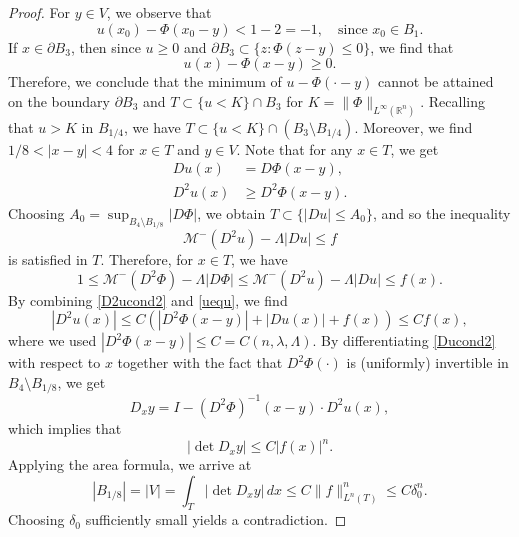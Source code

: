 \documentclass[11pt]{amsart}
\theoremstyle{plain}
\theoremstyle{definition}
\numberwithin{equation}{section}
\begin{document}
\begin{proof}
For $y \in V$, we observe that
\begin{equation*}
    u(x_0)-\Phi(x_0-y) < 1-2=-1, \quad \text{since $x_0 \in B_1$}.
\end{equation*}
If $x\in \partial B_3$, then since $u \geq 0$  and $\partial B_{3} \subset \{z:\Phi(z-y) \leq 0\}$, we find that
\begin{equation*}
    u(x) - \Phi(x-y) \geq 0.
\end{equation*}
Therefore, we conclude that the minimum of $u-\Phi(\cdot-y)$ cannot be attained on the boundary $\partial B_3$ and $T \subset \{ u<K\} \cap B_3$ for $K=\|\Phi\|_{L^\infty(\mathbb{R}^n)}$.
Recalling that $u>K$ in $B_{1/4}$, we have $T \subset \{ u<K\} \cap (B_3 \setminus B_{1/4})$.
Moreover, we find $1/8<|x-y| < 4$ for $x \in T$ and $y \in V$.
Note that for any $x \in T$, we get
\begin{align} \label{Ducond2}
    Du(x) &= D\Phi(x-y),\\ \label{D2ucond2}
    D^2u(x) &\geq D^2\Phi(x-y).
\end{align}
Choosing $A_0=\sup_{B_4\setminus B_{1/8}}|D\Phi|$, we obtain $T \subset \{|Du| \leq A_0\}$, and so the inequality
\begin{equation*}
    \mathcal{M}^-(D^2u)-\Lambda|Du| \leq f
\end{equation*}
is satisfied in $T$. Therefore, for $x \in T$, we have
\begin{equation} \label{uequ}
    1 \leq \mathcal{M}^-(D^2\Phi) -\Lambda|D\Phi| \leq \mathcal{M}^-(D^2u) -\Lambda|Du| \leq f(x).
\end{equation}
By combining \eqref{D2ucond2} and \eqref{uequ}, we find
\begin{equation*}
    |D^2u(x)| \leq C(|D^2\Phi(x-y)| + |Du(x)| +f(x)) \leq Cf(x),
\end{equation*}
where we used $|D^2\Phi(x-y)| \leq C=C(n, \lambda, \Lambda)$.
By differentiating \eqref{Ducond2} with respect to $x$ together with the fact that $D^2\Phi(\cdot)$ is (uniformly) invertible in $B_4 \setminus B_{1/8}$, we get
\begin{equation*}
	D_xy= I- (D^2 \Phi)^{-1}(x-y)  \cdot D^2u(x),
\end{equation*}
which implies that
\begin{equation*}
   |\det D_xy| \leq C|f(x)|^n.
\end{equation*}
Applying the area formula, we arrive at
\begin{equation*}
    |B_{1/8}| = |V| =\int_{T}|\det D_xy|\,dx \leq C\|f\|_{L^n(T)}^n \leq C\delta_0^n.
\end{equation*}
Choosing $\delta_0$ sufficiently small yields a contradiction.
\end{proof}
\end{document}

